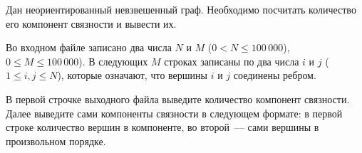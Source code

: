 Дан неориентированный невзвешенный граф. Необходимо посчитать количество его компонент связности и вывести их.

\InputFile
Во входном файле записано два числа $N$ и $M$ (${0 < N \leqslant 100\,000}$),
${0 \leqslant M \leqslant 100\,000}$). В следующих $M$ строках
записаны по два числа $i$ и $j$
(${1 \leqslant i,j \leqslant N}$), которые означают,
что вершины $i$ и $j$ соединены ребром.

\OutputFile
В первой строчке выходного файла выведите количество компонент связности.
Далее выведите сами компоненты связности в следующем формате:
в первой строке количество вершин в компоненте, во второй~--- сами
вершины в произвольном порядке.
